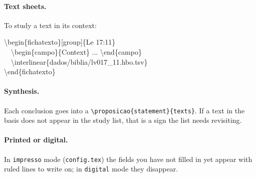 \paragraph{Text sheets.} To study a text in its context:

\begin{nota}[Example]
\small\ttfamily
\textbackslash begin\{fichatexto\}[group]\{Le 17:11\}\\
\ \ \textbackslash begin\{campo\}\{Context\} ... \textbackslash end\{campo\}\\
\ \ \textbackslash interlinear\{dados/biblia/lv017\_11.hbo.tsv\}\\
\textbackslash end\{fichatexto\}
\end{nota}

\paragraph{Synthesis.} Each conclusion goes into a
\verb|\proposicao{statement}{texts}|. If a text in the basis does not appear
in the study list, that is a sign the list needs revisiting.

\paragraph{Printed or digital.} In \texttt{impresso} mode
(\texttt{config.tex}) the fields you have not filled in yet appear with ruled
lines to write on; in \texttt{digital} mode they disappear.
